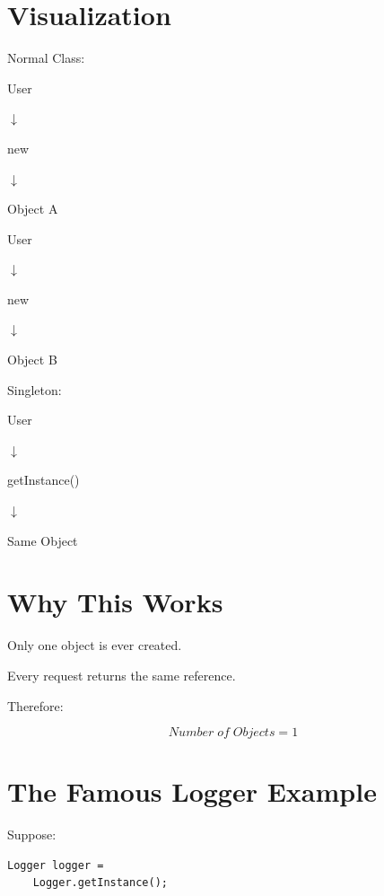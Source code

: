 \documentclass[11pt,a4paper]{book}
\begin{document}
\section{Visualization}

\begin{mentalmodel}

Normal Class:

User

$\downarrow$

new

$\downarrow$

Object A

User

$\downarrow$

new

$\downarrow$

Object B

Singleton:

User

$\downarrow$

getInstance()

$\downarrow$

Same Object

\end{mentalmodel}


\section{Why This Works}

\begin{idea}

Only one object is ever created.

Every request returns the same reference.

Therefore:

\[
Number\;of\;Objects = 1
\]

\end{idea}


\section{The Famous Logger Example}

Suppose:

\begin{verbatim}
Logger logger =
    Logger.getInstance();
\end{verbatim}
\end{document}
